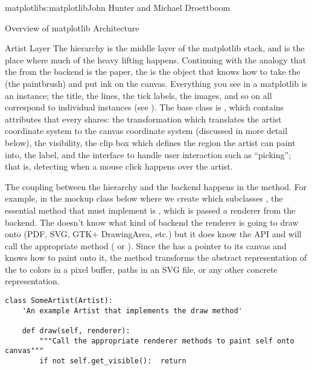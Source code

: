 \begin{aosachapter}{matplotlib}{s:matplotlib}{John Hunter and Michael Droettboom}
\begin{aosasect1}{Overview of matplotlib Architecture}
\begin{aosasect2}{Artist Layer}
The  hierarchy is the middle layer of the matplotlib
stack, and is the place where much of the heavy lifting happens.
Continuing with the analogy that the  from the
backend is the paper, the  is the object that knows how
to take the  (the paintbrush) and put ink on the
canvas.  Everything you see in a matplotlib  is an
 instance; the title, the lines, the tick labels, the
images, and so on all correspond to individual  instances
(see ).  The base class is
, which contains attributes that every
 shares: the transformation which translates the artist
coordinate system to the canvas coordinate system (discussed in more
detail below), the visibility, the clip box which defines the region
the artist can paint into, the label, and the interface to handle user
interaction such as ``picking''; that is, detecting when a mouse click
happens over the artist.



The coupling between the  hierarchy and the backend
happens in the  method.  For example, in the mockup class below
where we create  which subclasses , the
essential method that  must implement is ,
which is passed a renderer from the backend.
The  doesn't know what kind of backend the renderer is going to
draw onto (PDF, SVG, GTK+ DrawingArea, etc.) but it does know the
 API and will call the appropriate method
( or ).  Since the  has
a pointer to its canvas and knows how to paint onto it, the 
method transforms the abstract representation of the  to
colors in a pixel buffer, paths in an SVG file, or any other
concrete representation.

\begin{verbatim}
class SomeArtist(Artist):
    'An example Artist that implements the draw method'

    def draw(self, renderer):
        """Call the appropriate renderer methods to paint self onto canvas"""
        if not self.get_visible():  return


\end{verbatim}
\end{aosasect2}
\end{aosasect1}
\end{aosachapter}
